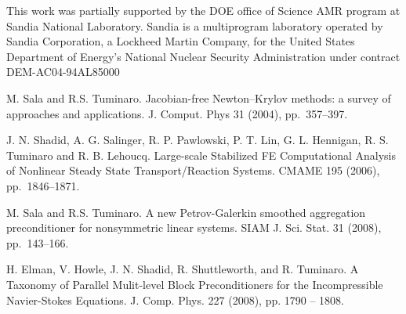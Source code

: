 This work was partially supported by  the DOE office of Science AMR program at Sandia National Laboratory. Sandia is a multiprogram laboratory operated by Sandia Corporation, a Lockheed Martin Company, for the United States Department of Energy's National Nuclear Security Administration under contract DEM-AC04-94AL85000


\begin{thebibliography}{10}

{\sc M. Sala and R.S. Tuminaro}. {Jacobian-free {N}ewton--{K}rylov methods: a survey of approaches and applications}. J. Comput. Phys 31 (2004), pp.~357--397.

{\sc J. N. Shadid, A. G. Salinger, R. P. Pawlowski, P. T. Lin, G. L. Hennigan, R. S. Tuminaro and R. B. Lehoucq}. {Large-scale Stabilized FE Computational Analysis of Nonlinear Steady State Transport/Reaction Systems}. CMAME 195 (2006), pp.~1846--1871.

{\sc M. Sala and R.S. Tuminaro}. { A new Petrov-Galerkin smoothed aggregation preconditioner for nonsymmetric linear systems}. SIAM J. Sci. Stat. 31 (2008), pp.~143--166.

{\sc H. Elman, V. Howle, J. N.  Shadid, R. Shuttleworth, and R. Tuminaro}.
\newblock A Taxonomy of Parallel Mulit-level Block Preconditioners for the Incompressible Navier-Stokes Equations.
\newblock J. Comp. Phys. 227 (2008), pp. 1790 --  1808. 

\end{thebibliography}
